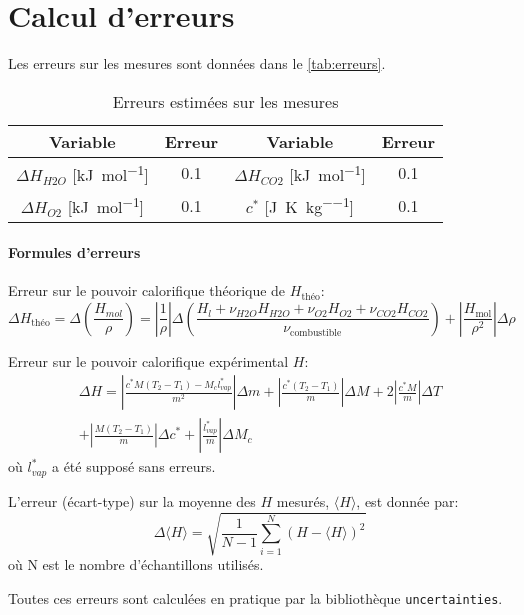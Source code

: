 \section{Calcul d'erreurs}
\label{sec:erreurs}

Les erreurs sur les mesures sont données dans le \autoref{tab:erreurs}.

\begin{table}[h]
    \centering
    \begin{tabulary}{\textwidth}{C C|C C}
        \toprule
        Variable & Erreur & Variable & Erreur \\
        \midrule
        \(\Delta H_{H2O}\) [\si{\kilo\joule\per\mole}] & 0.1 & \(\Delta H_{CO2}\) [\si{\kilo\joule\per\mole}] & 0.1 \\
        \(\Delta H_{O2}\) [\si{\kilo\joule\per\mole}] & 0.1 & \(c^*\) [\si{\joule\per\kelvin\per\kilo\gram}] & 0.1 \\
        \bottomrule
    \end{tabulary}
    \caption{Erreurs estimées sur les mesures}
    \label{tab:erreurs}
\end{table}


\paragraph*{Formules d'erreurs}

Erreur sur le pouvoir calorifique théorique de \(H_\textrm{théo}\):
\begin{equation}
    \Delta H_\textrm{théo} = \Delta(\frac{H_{mol}}{\rho}) = \left|\frac{1}{\rho}\right| \Delta \left(\frac{H_{l} + \nu_{H2O} H_{H2O} + \nu_{O2} H_{O2} + \nu_{CO2} H_{CO2}}{\nu_\textrm{combustible}}\right) + \left|\frac{H_\textrm{mol}}{\rho^2}\right| \Delta\rho
\end{equation}

Erreur sur le pouvoir calorifique expérimental \(H\):
\begin{multline}
    \Delta H = \left|\frac{c^* M (T_2 - T_1) - M_c l^*_{vap}}{m^2}\right| \Delta m + \left|\frac{c^* (T_2 - T_1)}{m}\right| \Delta M + 2 \left|\frac{c^* M}{m}\right| \Delta T \\+ \left|\frac{M (T_2 - T_1)}{m}\right| \Delta c^* + \left|\frac{l^*_{vap}}{m}\right| \Delta M_c
\end{multline}
où \(l^*_{vap}\) a été supposé sans erreurs.

L'erreur (écart-type) sur la moyenne des \(H\) mesurés, \(\langle H \rangle\), est donnée par:
\begin{equation}
    \Delta \langle H \rangle = \sqrt{\frac{1}{N - 1}\sum_{i=1}^{N}(H - \langle H \rangle)^2}
\end{equation}
où N est le nombre d'échantillons utilisés.

Toutes ces erreurs sont calculées en pratique par la bibliothèque \texttt{uncertainties}.
